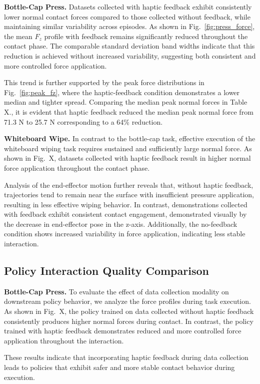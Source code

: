 \documentclass[letterpaper, 10 pt, conference]{ieeeconf}  %
\begin{document}
\textbf{Bottle-Cap Press.} Datasets collected with haptic feedback exhibit consistently lower normal contact forces compared to those collected without feedback, while maintaining similar variability across episodes. As shown in Fig.~\ref{fig:press_force}, the mean $F_z$ profile with feedback remains significantly reduced throughout the contact phase. The comparable standard deviation band widths indicate that this reduction is achieved without increased variability, suggesting both consistent and more controlled force application. 

This trend is further supported by the peak force distributions in Fig.~\ref{fig:peak_fz}, where the haptic-feedback condition demonstrates a lower median and tighter spread. Comparing the median peak normal forces in Table X., it is evident that haptic feedback reduced the median peak normal force from 71.3 N to 25.7 N corresponding to a 64\% reduction.

\textbf{Whiteboard Wipe.} In contrast to the bottle-cap task, effective execution of the whiteboard wiping task requires sustained and sufficiently large normal force. As shown in Fig.~X, datasets collected with haptic feedback result in higher normal force application throughout the contact phase. 

Analysis of the end-effector motion further reveals that, without haptic feedback, trajectories tend to remain near the surface with insufficient pressure application, resulting in less effective wiping behavior. In contrast, demonstrations collected with feedback exhibit consistent contact engagement, demonstrated visually by the decrease in end-effector pose in the z-axis. Additionally, the no-feedback condition shows increased variability in force application, indicating less stable interaction.

\subsection{Policy Interaction Quality Comparison}
\textbf{Bottle-Cap Press.} To evaluate the effect of data collection modality on downstream policy behavior, we analyze the force profiles during task execution. As shown in Fig.~X, the policy trained on data collected without haptic feedback consistently produces higher normal forces during contact. In contrast, the policy trained with haptic feedback demonstrates reduced and more controlled force application throughout the interaction. 

These results indicate that incorporating haptic feedback during data collection leads to policies that exhibit safer and more stable contact behavior during execution.
\end{document}
